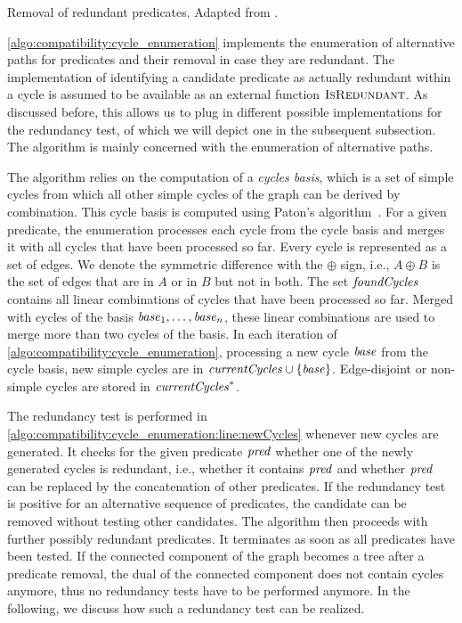 \begin{algorithm}
    
    \caption[Removal of redundant predicates]{Removal of redundant predicates. Adapted from .}
    \label{algo:compatibility:cycle_enumeration}
\end{algorithm}

\autoref{algo:compatibility:cycle_enumeration} implements the enumeration of alternative paths for predicates and their removal in case they are redundant.
The implementation of identifying a candidate predicate as actually redundant within a cycle is assumed to be available as an external function $\textsc{IsRedundant}$.
As discussed before, this allows us to plug in different possible implementations for the redundancy test, of which we will depict one in the subsequent subsection.
The algorithm is mainly concerned with the enumeration of alternative paths.

The algorithm relies on the computation of a \emph{cycles basis}, which is a set of simple cycles from which all other simple cycles of the graph can be derived by combination.
This cycle basis is computed using Paton's algorithm~\cite{paton1969algorithm}.
For a given predicate, the enumeration processes each cycle from the cycle basis and merges it with all cycles that have been processed so far. 
Every cycle is represented as a set of edges.
We denote the symmetric difference with the $\oplus$ sign, i.e., $A \oplus B$ is the set of edges that are in $A$ or in $B$ but not in both.
The set $\mathit{foundCycles}$ contains all linear combinations of cycles that have been processed so far.
Merged with cycles of the basis $\mathit{base}_1, \dots, \mathit{base}_n$, these linear combinations are used to merge more than two cycles of the basis.
In each iteration of \autoref{algo:compatibility:cycle_enumeration}, processing a new cycle $\mathit{base}$ from the cycle basis, new simple cycles are in $\mathit{currentCycles} \cup \{ \mathit{base} \}$. Edge-disjoint or non-simple cycles are stored in $\mathit{currentCycles}^*$.

The redundancy test is performed in \autoref{algo:compatibility:cycle_enumeration:line:newCycles} whenever new cycles are generated.
It checks for the given predicate $\mathit{pred}$ whether one of the newly generated cycles is redundant, i.e., whether it contains $\mathit{pred}$ and whether $\mathit{pred}$ can be replaced by the concatenation of other predicates.
If the redundancy test is positive for an alternative sequence of predicates, the candidate can be removed without testing other candidates.
The algorithm then proceeds with further possibly redundant predicates.
It terminates as soon as all predicates have been tested.
If the connected component of the graph becomes a tree after a predicate removal, the dual of the connected component does not contain cycles anymore, thus no redundancy tests have to be performed anymore.
In the following, we discuss how such a redundancy test can be realized.

